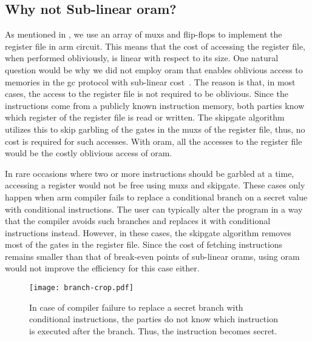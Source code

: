 \subsection{Why not Sub-linear \acrshort{oram}?}
As mentioned in , we use an array of \acrshort{mux}s and flip-flops to implement the register file in \gls{arm} circuit.
This means that the cost of accessing the register file, when performed obliviously, is linear with respect to its size.
One natural question would be why we did not employ \acrfull{oram} that enables oblivious access to memories in the \acrshort{gc} protocol with sub-linear cost~\cite{wang2014scoram, zahur2016revisit}.
The reason is that, in most cases, the access to the register file is not required to be oblivious.
Since the instructions come from a publicly known instruction memory, both parties know which register of the register file is read or written.
The \gls{skipgate} algorithm utilizes this to skip garbling of the gates in the \acrshort{mux}s of the register file, thus, no cost is required for such accesses.
With \acrshort{oram}, all the accesses to the register file would be the costly oblivious access of \acrshort{oram}.

In rare occasions where two or more instructions should be garbled at a time, accessing a register would not be free using \acrshort{mux}s and \gls{skipgate}.
These cases only happen when \gls{arm} compiler fails to replace a conditional branch on a secret value with conditional instructions.
The user can typically alter the program in a way that the compiler avoids such branches and replaces it with conditional instructions instead.
However, in these cases, the \gls{skipgate} algorithm removes most of the gates in the register file.
Since the cost of fetching instructions remains smaller than that of break-even points of sub-linear \acrshort{oram}s, using \acrshort{oram} would not improve the efficiency for this case either.

\begin{figure}
\centering
\texttt{[image: branch-crop.pdf]}
\caption{In case of compiler failure to replace a secret branch with conditional instructions, the parties do not know which instruction is executed after the branch.
Thus, the instruction becomes secret.}
\label{fig:branch}
\end{figure}

